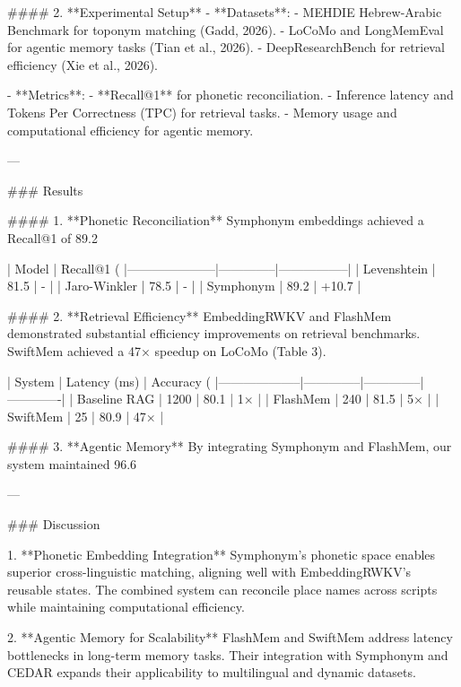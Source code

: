 #### 2. **Experimental Setup**  
- **Datasets**:  
  - MEHDIE Hebrew-Arabic Benchmark for toponym matching (Gadd, 2026).  
  - LoCoMo and LongMemEval for agentic memory tasks (Tian et al., 2026).  
  - DeepResearchBench for retrieval efficiency (Xie et al., 2026).  

- **Metrics**:  
  - **Recall@1** for phonetic reconciliation.  
  - Inference latency and Tokens Per Correctness (TPC) for retrieval tasks.  
  - Memory usage and computational efficiency for agentic memory.  

---

### Results  

#### 1. **Phonetic Reconciliation**  
Symphonym embeddings achieved a Recall@1 of 89.2%

| Model               | Recall@1 (%
|---------------------|--------------|-----------------|
| Levenshtein         | 81.5         | -               |
| Jaro-Winkler        | 78.5         | -               |
| Symphonym           | 89.2         | +10.7           |

#### 2. **Retrieval Efficiency**  
EmbeddingRWKV and FlashMem demonstrated substantial efficiency improvements on retrieval benchmarks. SwiftMem achieved a 47× speedup on LoCoMo (Table 3).

| System             | Latency (ms) | Accuracy (%
|--------------------|--------------|--------------|-------------|
| Baseline RAG       | 1200         | 80.1         | 1×          |
| FlashMem           | 240          | 81.5         | 5×          |
| SwiftMem           | 25           | 80.9         | 47×         |

#### 3. **Agentic Memory**  
By integrating Symphonym and FlashMem, our system maintained 96.6%

---

### Discussion  

1. **Phonetic Embedding Integration**  
Symphonym's phonetic space enables superior cross-linguistic matching, aligning well with EmbeddingRWKV's reusable states. The combined system can reconcile place names across scripts while maintaining computational efficiency.

2. **Agentic Memory for Scalability**  
FlashMem and SwiftMem address latency bottlenecks in long-term memory tasks. Their integration with Symphonym and CEDAR expands their applicability to multilingual and dynamic datasets.

